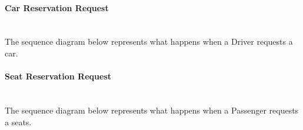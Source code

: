 \documentclass{article}
\begin{document}
				\pagebreak
				\paragraph{Car Reservation Request} \mbox{}\\
				The sequence diagram below represents what happens when a Driver requests a car.\\
				\begin{minipage}{\linewidth}
					\vspace{5mm}
					\vspace{5mm}
				\end{minipage}
				
				\pagebreak
				\paragraph{Seat Reservation Request} \mbox{}\\
				The sequence diagram below represents what happens when a Passenger requests a seats.\\
				\begin{minipage}{\linewidth}
					\vspace{5mm}
					\vspace{5mm}
				\end{minipage}
				
\end{document}
